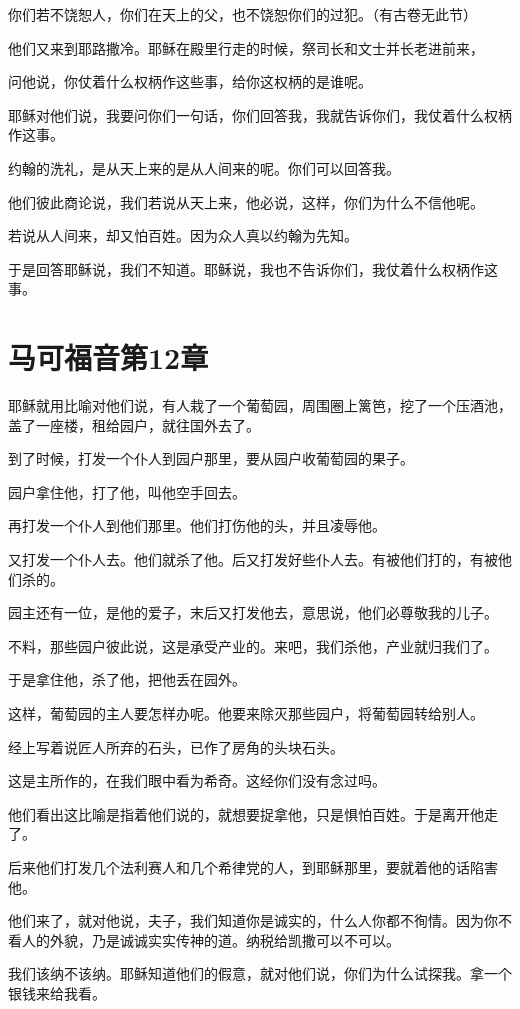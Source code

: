 \documentclass[12pt,oneside]{book}
\begin{document}
你们若不饶恕人，你们在天上的父，也不饶恕你们的过犯。（有古卷无此节）

他们又来到耶路撒冷。耶稣在殿里行走的时候，祭司长和文士并长老进前来，

问他说，你仗着什么权柄作这些事，给你这权柄的是谁呢。

耶稣对他们说，我要问你们一句话，你们回答我，我就告诉你们，我仗着什么权柄作这事。

约翰的洗礼，是从天上来的是从人间来的呢。你们可以回答我。

他们彼此商论说，我们若说从天上来，他必说，这样，你们为什么不信他呢。

若说从人间来，却又怕百姓。因为众人真以约翰为先知。

于是回答耶稣说，我们不知道。耶稣说，我也不告诉你们，我仗着什么权柄作这事。

\chapter{马可福音第12章}
耶稣就用比喻对他们说，有人栽了一个葡萄园，周围圈上篱笆，挖了一个压酒池，盖了一座楼，租给园户，就往国外去了。

到了时候，打发一个仆人到园户那里，要从园户收葡萄园的果子。

园户拿住他，打了他，叫他空手回去。

再打发一个仆人到他们那里。他们打伤他的头，并且凌辱他。

又打发一个仆人去。他们就杀了他。后又打发好些仆人去。有被他们打的，有被他们杀的。

园主还有一位，是他的爱子，末后又打发他去，意思说，他们必尊敬我的儿子。

不料，那些园户彼此说，这是承受产业的。来吧，我们杀他，产业就归我们了。

于是拿住他，杀了他，把他丢在园外。

这样，葡萄园的主人要怎样办呢。他要来除灭那些园户，将葡萄园转给别人。

经上写着说匠人所弃的石头，已作了房角的头块石头。

这是主所作的，在我们眼中看为希奇。这经你们没有念过吗。

他们看出这比喻是指着他们说的，就想要捉拿他，只是惧怕百姓。于是离开他走了。

后来他们打发几个法利赛人和几个希律党的人，到耶稣那里，要就着他的话陷害他。

他们来了，就对他说，夫子，我们知道你是诚实的，什么人你都不徇情。因为你不看人的外貌，乃是诚诚实实传神的道。纳税给凯撒可以不可以。

我们该纳不该纳。耶稣知道他们的假意，就对他们说，你们为什么试探我。拿一个银钱来给我看。
\end{document}
